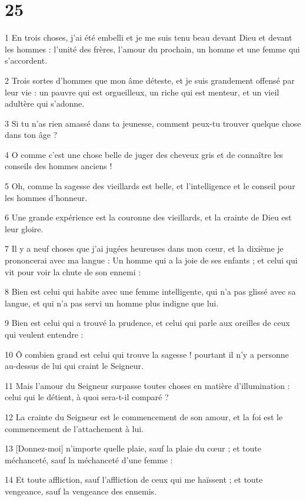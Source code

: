 \chapter{25}

\par 1 En trois choses, j'ai été embelli et je me suis tenu beau devant Dieu et devant les hommes : l'unité des frères, l'amour du prochain, un homme et une femme qui s'accordent.
\par 2 Trois sortes d'hommes que mon âme déteste, et je suis grandement offensé par leur vie : un pauvre qui est orgueilleux, un riche qui est menteur, et un vieil adultère qui s'adonne.
\par 3 Si tu n'as rien amassé dans ta jeunesse, comment peux-tu trouver quelque chose dans ton âge ?
\par 4 O comme c'est une chose belle de juger des cheveux gris et de connaître les conseils des hommes anciens !
\par 5 Oh, comme la sagesse des vieillards est belle, et l'intelligence et le conseil pour les hommes d'honneur.
\par 6 Une grande expérience est la couronne des vieillards, et la crainte de Dieu est leur gloire.
\par 7 Il y a neuf choses que j'ai jugées heureuses dans mon cœur, et la dixième je prononcerai avec ma langue : Un homme qui a la joie de ses enfants ; et celui qui vit pour voir la chute de son ennemi :
\par 8 Bien est celui qui habite avec une femme intelligente, qui n'a pas glissé avec sa langue, et qui n'a pas servi un homme plus indigne que lui.
\par 9 Bien est celui qui a trouvé la prudence, et celui qui parle aux oreilles de ceux qui veulent entendre :
\par 10 Ô combien grand est celui qui trouve la sagesse ! pourtant il n'y a personne au-dessus de lui qui craint le Seigneur.
\par 11 Mais l'amour du Seigneur surpasse toutes choses en matière d'illumination : celui qui le détient, à quoi sera-t-il comparé ?
\par 12 La crainte du Seigneur est le commencement de son amour, et la foi est le commencement de l'attachement à lui.
\par 13 [Donnez-moi] n'importe quelle plaie, sauf la plaie du cœur ; et toute méchanceté, sauf la méchanceté d'une femme :
\par 14 Et toute affliction, sauf l'affliction de ceux qui me haïssent ; et toute vengeance, sauf la vengeance des ennemis.
